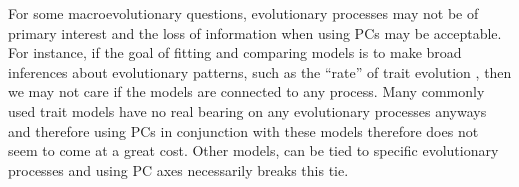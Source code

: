 \documentclass[a4paper,12pt]{article}
\begin{document}

For some macroevolutionary questions, evolutionary processes may not be of primary interest and the loss of information when using PCs may be acceptable. For instance, if the goal of fitting and comparing models is to make broad inferences about evolutionary patterns, such as the ``rate'' of trait evolution \citep{Freckleton2011, Hunt2012}, then we may not care if the models are connected to any process. Many commonly used trait models \citep[notably, the ``Pagel'' tree transformations $\lambda, \delta, \kappa$;][]{Pagel1997, Pagel1999} have no real bearing on any evolutionary processes anyways \citep{HansenOrzack2005} and therefore using PCs in conjunction with these models therefore does not seem to come at a great cost. Other models, can be tied to specific evolutionary processes \citep{HansenMartins1996, EstesArnold2007, Hansen2008, Hansen2012SysBio, PennellHarmon, PennellPE} and using PC axes necessarily breaks this tie.
\end{document}
